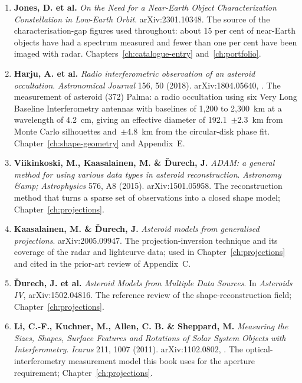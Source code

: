 \begin{enumerate}[leftmargin=2.9em,itemsep=4pt,resume]

\item \textbf{Jones, D. et al.} \emph{On the Need for a Near-Earth Object
Characterization Constellation in Low-Earth Orbit}. arXiv:2301.10348. The
source of the characterisation-gap figures used throughout: about 15 per cent
of near-Earth objects have had a spectrum measured and fewer than one per
cent have been imaged with radar. Chapters~\ref{ch:catalogue-entry}
and~\ref{ch:portfolio}.

\item \textbf{Harju, A. et al.} \emph{Radio interferometric observation of an
asteroid occultation}. \emph{Astronomical Journal} 156, 50 (2018).
arXiv:1804.05640, . The measurement
of asteroid (372) Palma: a radio occultation using six Very Long Baseline
Interferometry antennas with baselines of 1,200 to 2,300~km at a wavelength
of 4.2~cm, giving an effective diameter of 192.1~$\pm$2.3~km from
Monte Carlo silhouettes and~$\pm$4.8~km from the circular-disk phase fit.
Chapter~\ref{ch:shape-geometry} and Appendix~E.

\item \textbf{Viikinkoski, M., Kaasalainen, M. \& \v{D}urech, J.} \emph{ADAM:
a general method for using various data types in asteroid reconstruction}.
\emph{Astronomy \&amp; Astrophysics} 576, A8 (2015). arXiv:1501.05958. The
reconstruction method that turns a sparse set of observations into a closed
shape model; Chapter~\ref{ch:projections}.

\item \textbf{Kaasalainen, M. \& \v{D}urech, J.} \emph{Asteroid models from
generalised projections}. arXiv:2005.09947. The projection-inversion
technique and its coverage of the radar and lightcurve data; used in
Chapter~\ref{ch:projections} and cited in the prior-art review of
Appendix~C.

\item \textbf{\v{D}urech, J. et al.} \emph{Asteroid Models from Multiple
Data Sources}. In \emph{Asteroids IV}, arXiv:1502.04816. The reference
review of the shape-reconstruction field; Chapter~\ref{ch:projections}.

\item \textbf{Li, C.-F., Kuchner, M., Allen, C. B. \& Sheppard, M.} \emph{Measuring
the Sizes, Shapes, Surface Features and Rotations of Solar System Objects
with Interferometry}. \emph{Icarus} 211, 1007 (2011). arXiv:1102.0802,
. The optical-interferometry
measurement model this book uses for the aperture requirement; Chapter~\ref{ch:projections}.


\end{enumerate}
